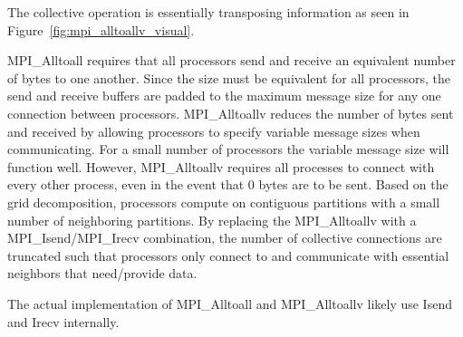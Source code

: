 \documentclass{report}
\begin{document}
The collective operation is essentially transposing information as seen in Figure~\ref{fig:mpi_alltoallv_visual}. 

MPI\_Alltoall requires that all processors send and receive an equivalent number of bytes to one another. Since the size must be equivalent for all processors, the send and receive buffers are padded to the maximum message size for any one connection between processors. MPI\_Alltoallv reduces the number of bytes sent and received by allowing processors to specify variable message sizes when communicating. For a small number of processors the variable message size will function well. However, MPI\_Alltoallv requires all processes to connect with every other process, even in the event that 0 bytes are to be sent. Based on the grid decomposition, processors compute on contiguous partitions with a small number of neighboring partitions. By replacing the MPI\_Alltoallv with a MPI\_Isend/MPI\_Irecv combination, the number of collective connections are truncated such that processors only connect to and communicate with essential neighbors that need/provide data. 

The actual implementation of MPI\_Alltoall and MPI\_Alltoallv likely use Isend and Irecv internally. 
\end{document}
